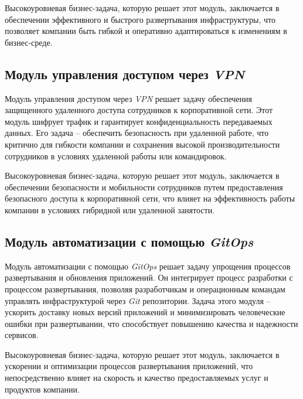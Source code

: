 Высокоуровневая бизнес-задача, которую решает этот модуль, заключается в обеспечении эффективного и быстрого развертывания инфраструктуры, что позволяет компании быть гибкой и оперативно адаптироваться к изменениям в бизнес-среде.

\subsection{Модуль управления доступом через \textit{VPN}} 
\label{sec:vpn_access_module}

Модуль управления доступом через \textit{VPN} решает задачу обеспечения защищенного удаленного доступа сотрудников к корпоративной сети. Этот модуль шифрует трафик и гарантирует конфиденциальность передаваемых данных. Его задача -- обеспечить безопасность при удаленной работе, что критично для гибкости компании и сохранения высокой производительности сотрудников в условиях удаленной работы или командировок.

Высокоуровневая бизнес-задача, которую решает этот модуль, заключается в обеспечении безопасности и мобильности сотрудников путем предоставления безопасного доступа к корпоративной сети, что влияет на эффективность работы компании в условиях гибридной или удаленной занятости.

\subsection{Модуль автоматизации с помощью \textit{GitOps}} 
\label{sec:gitops_automation_module}

Модуль автоматизации с помощью \textit{GitOps} решает задачу упрощения процессов развертывания и обновления приложений. Он интегрирует процесс разработки с процессом развертывания, позволяя разработчикам и операционным командам управлять инфраструктурой через 
\textit{Git} репозитории. Задача этого модуля -- ускорить доставку новых версий приложений и минимизировать человеческие ошибки при развертывании, что способствует повышению качества и надежности сервисов.

Высокоуровневая бизнес-задача, которую решает этот модуль, заключается в ускорении и оптимизации процессов развертывания приложений, что непосредственно влияет на скорость и качество предоставляемых услуг и продуктов компании.

